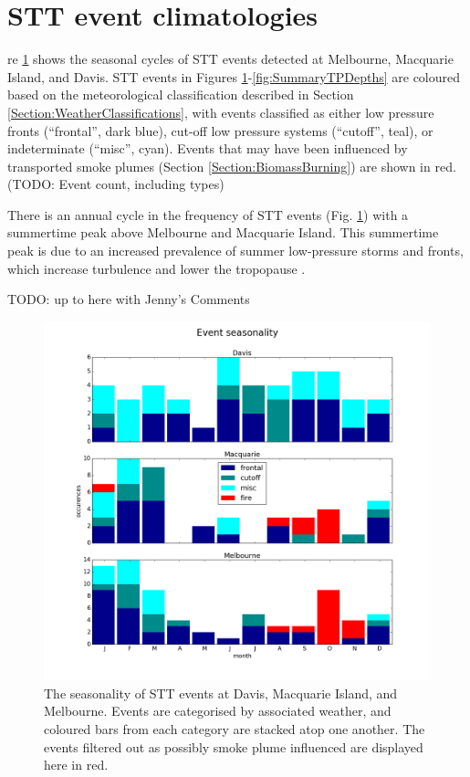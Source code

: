 \documentclass{article}
\begin{document}
\section{STT event climatologies}
  
  re \ref{fig:SummarySeasonality} shows the seasonal cycles of STT events detected at Melbourne, Macquarie Island, and Davis. 
  STT events in Figures \ref{fig:SummarySeasonality}-\ref{fig:SummaryTPDepths} are coloured based on the meteorological classification described in Section \ref{Section:WeatherClassifications}, with events classified as either low pressure fronts (“frontal”, dark blue), cut-off low pressure systems (“cutoff”, teal), or indeterminate (“misc”, cyan).
  Events that may have been influenced by transported smoke plumes (Section \ref{Section:BiomassBurning}) are shown in red.
  (TODO: Event count, including types)
  
  There is an annual cycle in the frequency of STT events  (Fig. \ref{fig:SummarySeasonality}) with a summertime peak above Melbourne and Macquarie Island.
  This summertime peak is due to an increased prevalence of summer low-pressure storms and fronts, which increase turbulence and lower the tropopause \citep{Reutter2015}.
  
  TODO: up to here with Jenny's Comments

  \begin{figure}[!htbp]
    \begin{center}
    \includegraphics[width=1.0\columnwidth]{figures/summary_season.png}
    \caption{The seasonality of STT events at Davis, Macquarie Island, and Melbourne.
    Events are categorised by associated weather, and coloured bars from each category are stacked atop one another.
    The events filtered out as possibly smoke plume influenced are displayed here in red.}
    \label{fig:SummarySeasonality}
    \end{center}
  \end{figure}
  
\end{document}
